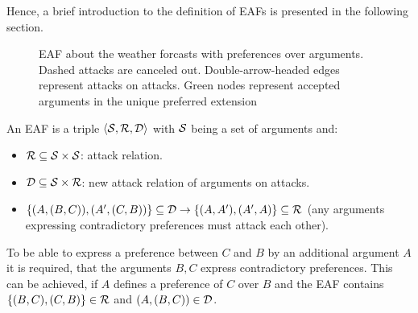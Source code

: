 Hence, a brief introduction to the definition of \glspl{EAF} is presented in the following section.
\begin{figure}[b!]
\centering
{}
\caption{\gls{EAF} about the weather forcasts with preferences over arguments. Dashed attacks are canceled out. Double-arrow-headed edges represent attacks on attacks. Green nodes represent accepted arguments in the unique preferred extension}
\label{fig:eaf_intro}
\end{figure}


\begin{definition}
	An \gls{EAF} is a triple $\langle \S, \R, \D \rangle$ with $\S$ being a set of arguments and:
	\begin{itemize}
		\item $\R \subseteq \S \times \S$: attack relation.
		\item $\D \subseteq \S \times \R$: new attack relation of arguments on attacks.
		\item $\{(A, (B, C)), (A', (C, B))\} \subseteq \D \rightarrow \{(A, A'), (A', A)\} \subseteq \R$ (any arguments expressing contradictory preferences must attack each other).
	\end{itemize}
\end{definition}

\begin{remark}
To be able to express a preference between $C$ and $B$ by an additional argument $A$ it is required, that the arguments $B, C$ express contradictory preferences. This can be achieved, if $A$ defines a preference of $C$ over $B$ and the \gls{EAF} contains $\{(B, C), (C, B)\} \in \R$ and $(A, (B, C)) \in \D$. 
\end{remark}

